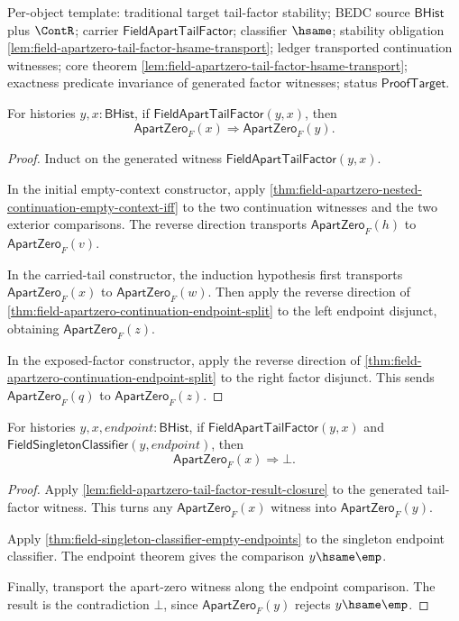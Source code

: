 Per-object template: traditional target tail-factor stability; BEDC source
$\mathsf{BHist}$ plus $\ContR$; carrier $\mathsf{FieldApartTailFactor}$;
classifier $\hsame$; stability obligation
\autoref{lem:field-apartzero-tail-factor-hsame-transport}; ledger transported
continuation witnesses; core theorem
\autoref{lem:field-apartzero-tail-factor-hsame-transport}; exactness predicate
invariance of generated factor witnesses; status $\mathsf{ProofTarget}$.

\begin{lemma}
\label{lem:field-apartzero-tail-factor-result-closure}
For histories $y,x:\mathsf{BHist}$, if
$\mathsf{FieldApartTailFactor}(y,x)$, then
$$
\mathsf{ApartZero}_F(x)\Rightarrow\mathsf{ApartZero}_F(y).
$$
\end{lemma}
\begin{proof}
Induct on the generated witness
$\mathsf{FieldApartTailFactor}(y,x)$.

In the initial empty-context constructor, apply
\autoref{thm:field-apartzero-nested-continuation-empty-context-iff} to the
two continuation witnesses and the two exterior comparisons. The reverse
direction transports $\mathsf{ApartZero}_F(h)$ to
$\mathsf{ApartZero}_F(v)$.

In the carried-tail constructor, the induction hypothesis first transports
$\mathsf{ApartZero}_F(x)$ to $\mathsf{ApartZero}_F(w)$. Then apply the
reverse direction of
\autoref{thm:field-apartzero-continuation-endpoint-split} to the left
endpoint disjunct, obtaining $\mathsf{ApartZero}_F(z)$.

In the exposed-factor constructor, apply the reverse direction of
\autoref{thm:field-apartzero-continuation-endpoint-split} to the right factor
disjunct. This sends $\mathsf{ApartZero}_F(q)$ to
$\mathsf{ApartZero}_F(z)$.
\end{proof}

\begin{theorem}
\label{thm:field-apartzero-finite-tail-singleton-result-exclusion}
For histories $y,x,endpoint:\mathsf{BHist}$, if
$\mathsf{FieldApartTailFactor}(y,x)$ and
$\mathsf{FieldSingletonClassifier}(y,endpoint)$, then
$$
\mathsf{ApartZero}_F(x)\Rightarrow\bot.
$$
\end{theorem}
\begin{proof}
Apply
\autoref{lem:field-apartzero-tail-factor-result-closure} to the generated
tail-factor witness. This turns any $\mathsf{ApartZero}_F(x)$ witness into
$\mathsf{ApartZero}_F(y)$.

Apply \autoref{thm:field-singleton-classifier-empty-endpoints} to the
singleton endpoint classifier. The endpoint theorem gives the comparison
$y\hsame\emp$.

Finally, transport the apart-zero witness along the endpoint comparison. The
result is the contradiction $\bot$, since $\mathsf{ApartZero}_F(y)$ rejects
$y\hsame\emp$.
\end{proof}

